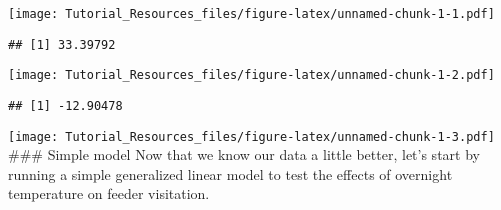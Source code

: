 \documentclass[
]{article}
\newenvironment{Shaded}{\begin{snugshade}}{\end{snugshade}}
\newcommand{\AttributeTok}[1]{\textcolor[rgb]{0.13,0.29,0.53}{#1}}
\newcommand{\DocumentationTok}[1]{\textcolor[rgb]{0.56,0.35,0.01}{\textbf{\textit{#1}}}}
\newcommand{\FunctionTok}[1]{\textcolor[rgb]{0.13,0.29,0.53}{\textbf{#1}}}
\newcommand{\NormalTok}[1]{#1}
\newcommand{\SpecialCharTok}[1]{\textcolor[rgb]{0.81,0.36,0.00}{\textbf{#1}}}
\newcommand{\StringTok}[1]{\textcolor[rgb]{0.31,0.60,0.02}{#1}}
\begin{document}
\texttt{[image: Tutorial\_Resources\_files/figure-latex/unnamed-chunk-1-1.pdf]}

\begin{Shaded}
\end{Shaded}

\begin{verbatim}
## [1] 33.39792
\end{verbatim}

\begin{Shaded}
\end{Shaded}

\texttt{[image: Tutorial\_Resources\_files/figure-latex/unnamed-chunk-1-2.pdf]}

\begin{Shaded}
\end{Shaded}

\begin{verbatim}
## [1] -12.90478
\end{verbatim}

\begin{Shaded}
\end{Shaded}

\texttt{[image: Tutorial\_Resources\_files/figure-latex/unnamed-chunk-1-3.pdf]}
\#\#\# Simple model Now that we know our data a little better, let's
start by running a simple generalized linear model to test the effects
of overnight temperature on feeder visitation.
\end{document}
